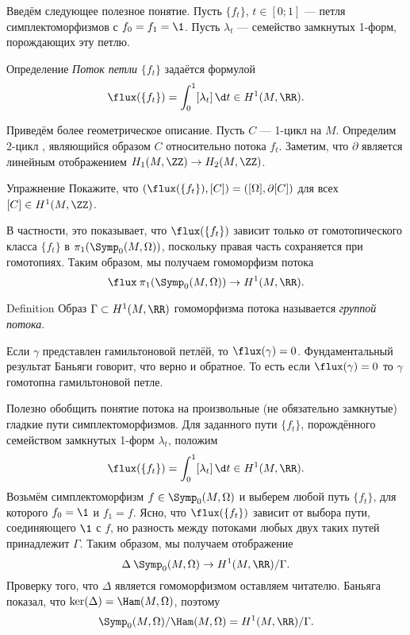 Введём следующее полезное понятие.
Пусть $\{f_t\}$, $t\in[0;1]$ --- петля симплектоморфизмов с $f_0 = f_1 = \1$.
Пусть ${\lambda_t}$ --- семейство замкнутых 1-форм, порождающих эту петлю.

\begin{ex*}{Определение}
\emph{Поток петли} $\{f_t\}$ задаётся формулой
\index[symb]{$\flux$} 
\[\flux(\{f_t\}) = \int_0^1 [\lambda_t]\,\d t \in H^1(M, \RR).\]
\end{ex*}

Приведём более геометрическое описание.
Пусть $C$ --- 1-цикл на $M$.
Определим 2-цикл , являющийся образом $C$ относительно потока $f_t$. 
Заметим, что $\partial$ является линейным отображением $H_1(M,\ZZ)\to H_2(M,\ZZ)$.

\begin{ex*}{Упражнение}
Покажите, что $(\flux(\{f_t\}), [C]) = ([\Omega], \partial[C])$ для
всех $[C]\in H^1(M,\ZZ)$. 
\end{ex*}

В частности, это показывает, что $\flux(\{f_t\})$ зависит только от гомотопического класса $\{f_t\}$ в $\pi_1 (\Symp_0(M,\Omega))$, поскольку правая часть сохраняется при гомотопиях.
Таким образом, мы получаем гомоморфизм потока
\[\flux\:\pi_1(\Symp_0(M,\Omega))\to H^1(M,\RR).\]

\begin{ex*}{Definition}
Образ $\Gamma \subset H^1(M, \RR)$ гомоморфизма потока называется
\emph{группой потока}. 
\end{ex*}


Если $\gamma$ представлен гамильтоновой петлёй, то $\flux(\gamma) = 0$.
Фундаментальный результат Баньяги \cite{B1} говорит,
что верно и обратное. 
То есть если $\flux(\gamma) = 0$ то $\gamma$ гомотопна гамильтоновой петле.

Полезно обобщить понятие потока на произвольные (не обязательно
замкнутые) гладкие пути симплектоморфизмов. 
Для заданного пути $\{f_t\}$, порождённого семейством замкнутых 1-форм
$\lambda_t$, положим  
\[\flux(\{f_t\})=\int_0^1[\lambda_t]\,\d t\in H^1(M,\RR).\]
Возьмём симплектоморфизм $f \in \Symp_0(M,\Omega)$ и выберем любой
путь $\{f_t\}$, для которого $f_0 = \1$ и $f_1 = f$.
Ясно, что $\flux (\{f_t\})$ зависит от выбора пути, соединяющего $\1$
с $f$, но разность между потоками любых двух таких путей принадлежит
$\Gamma$. 
Таким образом, мы получаем отображение
\[\Delta\:\Symp_0(M,\Omega)\to H^1(M,\RR)/\Gamma.\]
Проверку того, что $\Delta$ является гомоморфизмом оставляем читателю.
Баньяга показал, что $\ker(\Delta) = \Ham(M,\Omega)$, поэтому 
\[\Symp_0(M,\Omega)/\Ham(M,\Omega) = H^1(M, \RR)/\Gamma.\]

